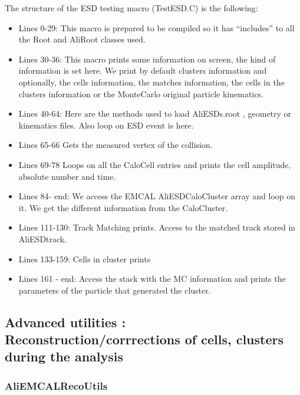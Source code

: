 The structure of the ESD testing macro (TestESD.C) is the
following:

\begin{itemize}
\item Lines 0-29: This macro is prepared to be compiled so it has ``includes'' to all the Root and AliRoot classes used.

\item Lines 30-36: This macro prints some information on screen, the kind of information is set here. We  print by default clusters information and optionally, the cells information, the matches information, the cells in the clusters information or the MonteCarlo original particle kinematics.

\item Lines 40-64: Here are the methods used to load AliESDs.root , geometry or kinematics files. Also loop on ESD event is here.

\item Lines 65-66 Gets the measured vertex of the collision.

\item Lines 69-78 Loops on all the CaloCell entries and prints the cell amplitude, absolute number and time.
 
\item Lines 84- end:  We access the  EMCAL AliESDCaloCluster  array and loop on it. 
We get the different information from the CaloCluster.

\item Lines 111-130:  Track Matching prints. Access to the matched track stored in AliESDtrack.

\item Lines 133-159: Cells in cluster prints

\item Lines  161 - end: Access the stack with the MC information and prints the parameters of the particle that generated the cluster.


\end{itemize}

\subsection{Advanced utilities : Reconstruction/corrrections of cells, clusters  during the analysis}

\subsubsection{AliEMCALRecoUtils}
